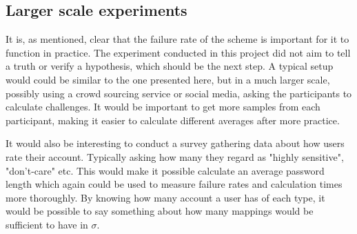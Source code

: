 \subsection{Larger scale experiments}
It is, as mentioned, clear that the failure rate of the scheme is important for it to function in practice. The experiment conducted in this project did not aim to tell a truth or verify a hypothesis, which should be the next step. A typical setup would could be similar to the one presented here, but in a much larger scale, possibly using a crowd sourcing service or social media, asking the participants to calculate challenges. It would be important to get more samples from each participant, making it easier to calculate different averages after more practice.  
\par It would also be interesting to conduct a survey gathering data about how users rate their account. Typically asking how many they regard as "highly sensitive", "don't-care" etc. This would make it possible calculate an average password length which again could be used to measure failure rates and calculation times more thoroughly. By knowing how many account a user has of each type, it would be possible to say something about how many mappings would be sufficient to have in $\sigma$. 

